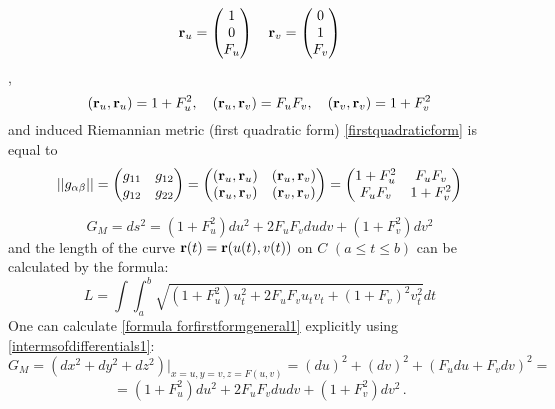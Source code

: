 \documentclass[12pt]{article}
\theoremstyle{theorem}
\numberwithin{equation}{section}
\begin{document}
  \begin{equation}\label{c}
  {\bf r}_u=\begin{pmatrix}
        1\\
        0\\
        F_u\\
   \end{pmatrix}
\quad
  {\bf r}_v=\begin{pmatrix}
        0\\
        1\\
        F_v\\
   \end{pmatrix}
 \end{equation},
            $$
     ({\bf r}_u,{\bf r}_u)=1+F_u^2,\quad
     ({\bf r}_u,{\bf r}_v)=F_uF_v,\quad
     ({\bf r}_v,{\bf r}_v)=1+F_v^2
            $$
and induced Riemannian metric (first quadratic form) \eqref{firstquadraticform} is equal to
\begin{equation}\label{formula forfirstform}
   ||g_{\alpha\beta}||=
\begin{pmatrix}
   g_{11} & g_{12} \\
   g_{12}& g_{22} \\
   \end{pmatrix}=
   \begin{pmatrix}
   ({\bf r}_u,{\bf r}_u) & ({\bf r}_u,{\bf r}_v) \\
   ({\bf r}_u,{\bf r}_v) & ({\bf r}_v,{\bf r}_v) \\
   \end{pmatrix}=   \begin{pmatrix}
   1+F_u^2 & F_uF_v \\
   F_uF_v& 1+F_v^2 \\
   \end{pmatrix}
\end{equation}

\begin{equation}\label{formula forfirstformgeneral1}
   G_M=ds^2=(1+F_u^2)du^2+2F_uF_vdudv+(1+F_v^2)dv^2
\end{equation}
  and the length of the curve ${\bf r}(t)={\bf r} (u(t), v(t))$ on $C$  $(a\leq t\leq b)$
  can be calculated by the formula:
               \begin{equation*}
             L=\int
             \int_a^b\sqrt{(1+F_u^2)u_t^2+2F_uF_vu_tv_t+(1+F_v)^2v^2_t}dt
               \end{equation*}
One can calculate \eqref{formula forfirstformgeneral1} explicitly using \eqref{intermsofdifferentials1}:
                     $$
                                    G_M=\left(dx^2+dy^2+dz^2\right)\big\vert_{x=u,y=v,z=F(u,v)}=
               (du)^2+(dv)^2+(F_udu+F_vdv)^2=
                     $$
               \begin{equation}\label{formula forfirstformgeneral2}
=(1+F_u^2)du^2+2F_uF_vdudv+(1+F_v^2)dv^2\,.
               \end{equation}
\end{document}
